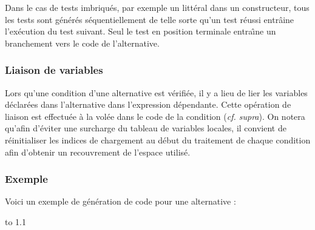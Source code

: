 Dans le cas de tests imbriqu\'es, par exemple un litt\'eral dans un
constructeur, tous les tests sont g\'en\'er\'es s\'equentiellement de telle
sorte qu'un test r\'eussi entr\^aine l'ex\'ecution du test suivant. Seul le
test en position terminale entra\^{\i}ne un branchement vers le code de
l'alternative. 

\subsubsection{Liaison de variables}
\label{altern:genbind}

Lors qu'une condition d'une alternative est v\'erifi\'ee, il y a lieu de
lier les variables d\'eclar\'ees dans l'alternative dans l'expression
d\'ependante. Cette op\'eration de liaison est effectu\'ee \`a la vol\'ee dans
le code de la condition (\emph{cf. supra}). On notera qu'afin d'\'eviter
une surcharge du tableau de variables locales, il convient de
r\'einitialiser les indices de chargement au d\'ebut du traitement de
chaque condition afin d'obtenir un recouvrement de l'espace utilis\'e. 

\subsubsection{Exemple}

Voici un exemple de g\'en\'eration de code pour une alternative :

\hspace{-2cm}\hbox to 1.1

